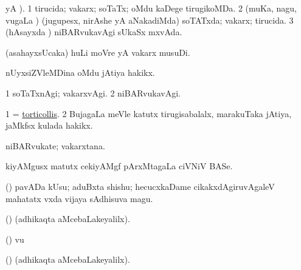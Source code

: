 \bentry
{} 
\gl{\gu}
 yA ).
\bmng
\bnum
\num{1} tirucida; vakarx; soTaTx; oMdu kaDege tirugikoMDa. 
\num{2} (muKa, nagu, \mo vugaLa \vi) (jugupesx, nirAshe yA aNakadiMda) soTATxda; vakarx; tirucida. 
\num{3} (hAsayxda \vi) niBARvukavAgi sUkaSx mxvAda. 
\enum
\emng

\noindent
\gl{\pagu}
\expl{}
\bmng
{} (asahayxsUcaka) huLi moVre yA vakarx musuDi. 
\emng
\eentry

\bentry
{} 
\gl{\nA}
\expl{}
\bmng
nUyxsiZVleMDina oMdu jAtiya hakikx. 
\emng
\eentry

\bentry
{} 
\gl{\kirxvi}
\expl{}
\bmng
\bnum
\num{1} soTaTxnAgi; vakarxvAgi. 
\num{2} niBARvukavAgi. 
\enum
\emng
\eentry

\bentry
{} 
\gl{\nA}
\expl{}
\bmng
\bnum
\num{1} = \hyperref{kandict_t.pdf}{T}{torticollis}{torticollis}. 
\num{2} BujagaLa meVle katutx tirugisabalalx, marakuTaka jAtiya, jaMkfsx kulada hakikx. 
\enum
\emng
\eentry

\bentry
{} 
\gl{\nA}
\expl{}
\bmng
niBARvukate; vakarxtana. 
\emng
\eentry

\bentry
{} 
\gl{\saMkiSx}
\expl{}
\bmng
{} 
\emng
\eentry

\bentry
{} 
\gl{\saMkiSx}
\expl{}
\bmng
{} 
\emng
\eentry

\bentry
{} 
\gl{\nA}
\expl{}
\bmng
kiyAMgusx matutx cekiyAMgf pArxMtagaLa ciVNiV BASe. 
\emng
\eentry

\bentry
{} 
\gl{\nA}
\expl{}
\bmng
(\AmA) pavADa kUsu; aduBxta shishu; hecucxkaDame cikakxdAgiruvAgaleV mahatatx vxda vijaya sAdhisuva magu. 
\emng
\eentry

\bentry
{} 
\gl{\saMkiSx}
\expl{}
\bmng
(\ame)  (adhikaqta aMcebaLakeyalilx). 
\emng
\eentry

\bentry
{} 
\gl{\saMkiSx}
\expl{}
\bmng
(\ame)  \mo vu 
\emng
\eentry

\bentry
{} 
\gl{\saMkiSx}
\expl{}
\bmng
{} 
\emng
\eentry

\bentry
{} 
\gl{\saMkiSx}
\expl{}
\bmng
(\ame)  (adhikaqta aMcebaLakeyalilx). 
\emng
\eentry

